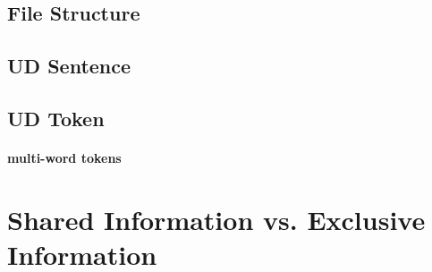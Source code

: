\subsection{File Structure} %
\label{sub:File Structure}

\subsection{UD Sentence}

\subsection{UD Token}

\paragraph{multi-word tokens}


\section{Shared Information vs. Exclusive Information}
